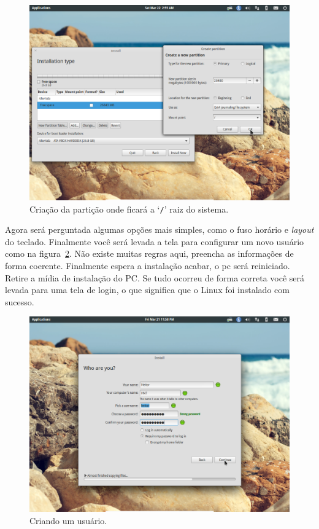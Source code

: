 \documentclass{handout_utfpr}
\begin{document}
\begin{figure}[H]
  \centering
  \includegraphics[scale=.3]{imagens/elementary-install-05.png}
  \caption{Criação da partição onde ficará a `\texttt{/}' raiz do sistema.}
  \label{fig:elementary-root}
\end{figure}

Agora será perguntada algumas opções mais simples, como o fuso horário e \textit{layout} do teclado. Finalmente você será levada a tela para configurar um novo usuário como na figura~\ref{fig:elementary-info}. Não existe muitas regras aqui, preencha as informações de forma coerente. Finalmente espera a instalação acabar, o pc será reiniciado. Retire a mídia de instalação do PC\@. Se tudo ocorreu de forma correta você será levada para uma tela de login, o que significa que o Linux foi instalado com sucesso.

\begin{figure}[H]
  \centering
  \includegraphics[scale=.3]{imagens/elementary-install-10.png}
  \caption{Criando um usuário.}
  \label{fig:elementary-info}
\end{figure}
\end{document}
